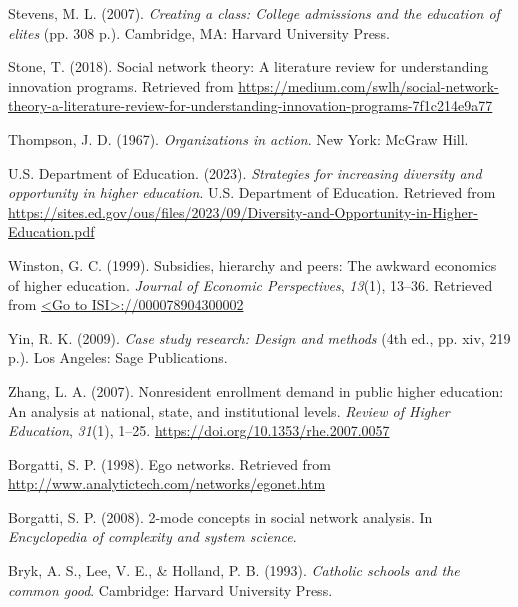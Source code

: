 \documentclass[
  12pt,
]{article}
\newlength{\cslhangindent}
\newlength{\cslentryspacingunit} %
\newenvironment{CSLReferences}[2] %
 {%
  \setlength{\parindent}{0pt}
  \ifodd #1
  \let\oldpar\par
  \def\par{\hangindent=\cslhangindent\oldpar}
  \fi
  \setlength{\parskip}{#2\cslentryspacingunit}
 }%
 {}
\begin{document}
\begin{CSLReferences}{1}{0}
\leavevmode{}%
Stevens, M. L. (2007). \emph{Creating a class: College admissions and the education of elites} (pp. 308 p.). Cambridge, MA: Harvard University Press.

\leavevmode{}%
Stone, T. (2018). Social network theory: A literature review for understanding innovation programs. Retrieved from \url{https://medium.com/swlh/social-network-theory-a-literature-review-for-understanding-innovation-programs-7f1c214e9a77}

\leavevmode{}%
Thompson, J. D. (1967). \emph{Organizations in action}. New York: McGraw Hill.

\leavevmode{}%
U.S. Department of Education. (2023). \emph{Strategies for increasing diversity and opportunity in higher education}. U.S. Department of Education. Retrieved from \url{https://sites.ed.gov/ous/files/2023/09/Diversity-and-Opportunity-in-Higher-Education.pdf}

\leavevmode{}%
Winston, G. C. (1999). Subsidies, hierarchy and peers: The awkward economics of higher education. \emph{Journal of Economic Perspectives}, \emph{13}(1), 13--36. Retrieved from \href{\%3CGo\%20to\%20ISI\%3E://000078904300002}{\textless Go to ISI\textgreater://000078904300002}

\leavevmode{}%
Yin, R. K. (2009). \emph{Case study research: Design and methods} (4th ed., pp. xiv, 219 p.). Los Angeles: Sage Publications.

\leavevmode{}%
Zhang, L. A. (2007). Nonresident enrollment demand in public higher education: An analysis at national, state, and institutional levels. \emph{Review of Higher Education}, \emph{31}(1), 1--25. \url{https://doi.org/10.1353/rhe.2007.0057}

\leavevmode{}%
Borgatti, S. P. (1998). Ego networks. Retrieved from \url{http://www.analytictech.com/networks/egonet.htm}

\leavevmode{}%
Borgatti, S. P. (2008). 2-mode concepts in social network analysis. In \emph{Encyclopedia of complexity and system science}.

\leavevmode{}%
Bryk, A. S., Lee, V. E., \& Holland, P. B. (1993). \emph{Catholic schools and the common good}. Cambridge: Harvard University Press.


\end{CSLReferences}
\end{document}
